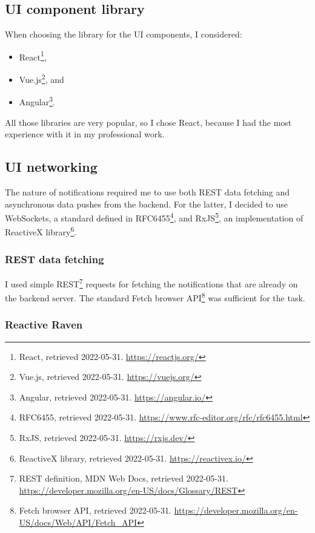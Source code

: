 \subsection{UI component library}\label{ui-component-library}

When choosing the library for the UI components, I considered:

\begin{itemize}
  \item
    React\footnote{React, retrieved 2022-05-31. \url{https://reactjs.org/}},
  \item
    Vue.js\footnote{Vue.js, retrieved 2022-05-31. \url{https://vuejs.org/}},
    and
  \item
    Angular\footnote{Angular, retrieved 2022-05-31.
    \url{https://angular.io/}}.
\end{itemize}

All those libraries are very popular, so I chose React, because I had
the most experience with it in my professional work.

\subsection{UI networking}\label{ui-networking}

The nature of notifications required me to use both REST data fetching
and asynchronous data pushes from the backend. For the latter, I decided
to use WebSockets, a standard defined in RFC6455\footnote{RFC6455,
retrieved 2022-05-31.
\url{https://www.rfc-editor.org/rfc/rfc6455.html}}, and
RxJS\footnote{RxJS, retrieved 2022-05-31. \url{https://rxjs.dev/}}, an
implementation of ReactiveX library\footnote{ReactiveX library,
retrieved 2022-05-31. \url{https://reactivex.io/}}.

\subsubsection{REST data fetching}\label{rest-data-fetching}

I used simple REST\footnote{REST definition, MDN Web Docs, retrieved
2022-05-31.
\url{https://developer.mozilla.org/en-US/docs/Glossary/REST}} requests
for fetching the notifications that are already on the backend server.
The standard Fetch browser API\footnote{Fetch browser API, retrieved
2022-05-31.
\url{https://developer.mozilla.org/en-US/docs/Web/API/Fetch_API}} was
sufficient for the task.

\subsubsection{Reactive Raven}\label{reactive-raven}

